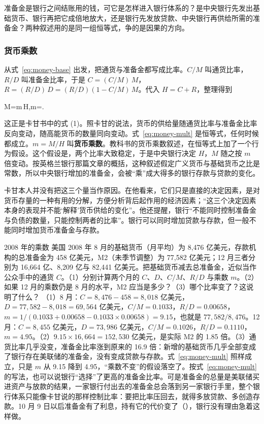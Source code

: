 准备金是银行之间结账用的钱，可它是怎样进入银行体系的？是中央银行先发出基础货币、银行再把它成倍地放大，还是银行先发放贷款、中央银行再供给所需的准备金？两种叙述用的是同一组恒等式，争的是因果的方向。

\subsubsection{货币乘数}
从式~\eqref{eq:money-base} 出发，把通货与准备金都写成比率。$C/M$ 叫通货比率，$R/D$ 叫准备金比率，于是 $C=(C/M)\,M$，$R=(R/D)\,D=(R/D)(1-C/M)\,M$。代入 $H=C+R$，整理得到
\begin{keyeq}
M=m\,H,\qquad m=.\label{eq:money-mult}
\end{keyeq}
这正是卡甘书中的式 (1)\cite{cagan1965}。照卡甘的说法，货币的供给量随通货比率与准备金比率反向变动，随高能货币的数量同向变动\cite{cagan1965}。式~\eqref{eq:money-mult} 是恒等式，任何时候都成立。$m=M/H$ 叫\textbf{货币乘数}。教科书的货币乘数叙述，在恒等式上加了一个行为假设。这个假设是，两个比率大致稳定，于是中央银行决定 $H$，$M$ 随之按 $m$ 倍变动。按英格兰银行那篇文章的概括，这种叙述假定广义货币与基础货币之比是常数，所以中央银行增加的准备金，会被“乘”成大得多的银行存款与贷款的变化\cite{mcleay2014}。

卡甘本人并没有把这三个量当作原因。在他看来，它们只是直接的决定因素，是对货币存量的一种有用的分解，方便分析背后起作用的经济因素；“这三个决定因素本身的表现并不能‘解释’货币供给的变化”\cite{cagan1965}。他还提醒，银行“不能同时控制准备金与负债的数量，只能控制两者的比率”。银行可以同时增加贷款与存款，但一般不能同时增加货币准备金与存款\cite{cagan1965}。

\begin{example}{2008 年的乘数}\label{ex:money-mult}
美国 2008 年 8 月的基础货币（月平均）为 8,476 亿美元，存款机构的总准备金为 458 亿美元，M2（未季节调整）为 77,582 亿美元；12 月三者分别为 16,664 亿、8,209 亿与 82,441 亿美元\cite{fred2026m}。把基础货币减去总准备金，近似当作公众手中的通货 $C$。（1）分别计算两个月的 $C$、$D$、$C/M$、$R/D$ 与乘数 $m$。（2）如果 12 月的乘数仍是 8 月的水平，M2 应当是多少？（3）哪个比率变了？这说明了什么？
\solution （1）8 月：$C=8{,}476-458=8{,}018$ 亿美元，$D=77{,}582-8{,}018=69{,}564$ 亿美元，$C/M=0.1033$，$R/D=0.00658$，$m=1/(0.1033+0.00658-0.1033\times0.00658)=9.15$，也就是 $77{,}582/8{,}476$。12 月：$C=8{,}455$ 亿美元，$D=73{,}986$ 亿美元，$C/M=0.1026$，$R/D=0.1110$，$m=4.95$。（2）$9.15\times16{,}664=152{,}530$ 亿美元，是实际 M2 的 1.85 倍。（3）通货比率几乎没变，准备金比率涨到原来的 16.9 倍：新增的基础货币几乎全部变成了银行存在美联储的准备金，没有变成贷款与存款。式~\eqref{eq:money-mult} 照样成立，只是 $m$ 从 9.15 降到 4.95，“乘数不变”的假设落空了。按式~\eqref{eq:money-mult} 的写法，也可以说银行“选择”了更高的准备金比率。可是准备金的总量是美联储买进资产与放款的结果，一家银行付出去的准备金总会落到另一家银行手里，整个银行体系只能像卡甘说的那样控制比率：要把比率压回去，就得多放贷款、多创造存款。10 月 9 日以后准备金有了利息，持有它的代价变了（），银行没有理由急着这样做。
\end{example}


